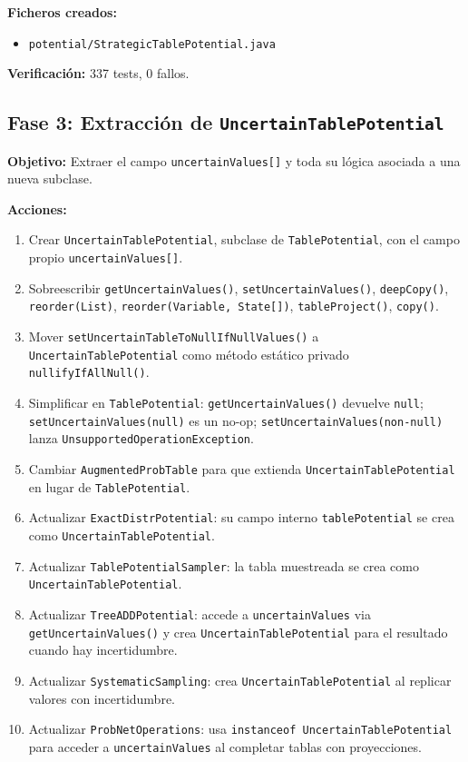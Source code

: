 \documentclass[11pt,a4paper]{article}
\newcommand{\code}[1]{\texttt{#1}}
\begin{document}
\textbf{Ficheros creados:}
\begin{itemize}
  \item \code{potential/StrategicTablePotential.java}
\end{itemize}

\textbf{Verificación:} 337 tests, 0 fallos.

\subsection{Fase 3: Extracción de \code{UncertainTablePotential}}

\textbf{Objetivo:} Extraer el campo \code{uncertainValues[]} y toda su lógica
asociada a una nueva subclase.

\textbf{Acciones:}
\begin{enumerate}
  \item Crear \code{Uncertain\-Table\-Potential}, subclase de
        \code{Table\-Potential}, con el campo propio
        \code{uncertainValues[]}.
  \item Sobreescribir \code{getUncertainValues()}, \code{setUncertainValues()},
        \code{deepCopy()}, \code{reorder(List)}, \code{reorder(Variable, State[])},
        \code{tableProject()}, \code{copy()}.
  \item Mover \code{set\-Uncertain\-Table\-To\-Null\-If\-Null\-Values()} a
        \code{Uncertain\-Table\-Potential} como método estático privado
        \code{nullify\-If\-All\-Null()}.
  \item Simplificar en \code{Table\-Potential}: \code{get\-Uncertain\-Values()}
        devuelve \code{null}; \code{set\-Uncertain\-Values(null)} es un no-op;
        \code{set\-Uncertain\-Values(non-null)} lanza
        \code{Unsupported\-Operation\-Exception}.
  \item Cambiar \code{AugmentedProbTable} para que extienda
        \code{UncertainTablePotential} en lugar de \code{TablePotential}.
  \item Actualizar \code{ExactDistrPotential}: su campo interno
        \code{tablePotential} se crea como \code{UncertainTablePotential}.
  \item Actualizar \code{Table\-Potential\-Sampler}: la tabla muestreada se crea como
        \code{Uncertain\-Table\-Potential}.
  \item Actualizar \code{TreeADDPotential}: accede a \code{uncertainValues} via
        \code{getUncertainValues()} y crea \code{UncertainTablePotential} para el
        resultado cuando hay incertidumbre.
  \item Actualizar \code{SystematicSampling}: crea \code{UncertainTablePotential}
        al replicar valores con incertidumbre.
  \item Actualizar \code{ProbNetOperations}: usa \code{instanceof
        UncertainTablePotential} para acceder a \code{uncertainValues} al
        completar tablas con proyecciones.
\end{enumerate}
\end{document}
